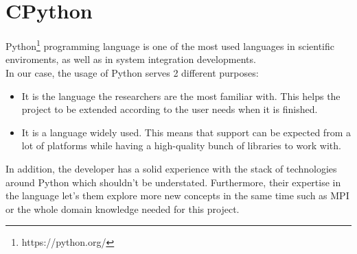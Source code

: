 \section{CPython}

Python\footnote{https://python.org/} programming language is one of the most used
languages in scientific enviroments, as well as in system integration developments.\\

In our case, the usage of Python serves 2 different purposes:
\begin{itemize}
  \item It is the language the researchers are the most familiar with. This
  helps the project to be extended according to the user needs when it is finished.
  \item It is a language widely used. This means that support can be expected
  from a lot of platforms while having a high-quality bunch of libraries to work
  with.
\end{itemize}


In addition, the developer has a solid experience with the stack of
technologies around Python which shouldn't be understated. Furthermore, their
expertise in the language let's them explore more new concepts in the same time
such as MPI or the whole domain knowledge needed for this project.\\
